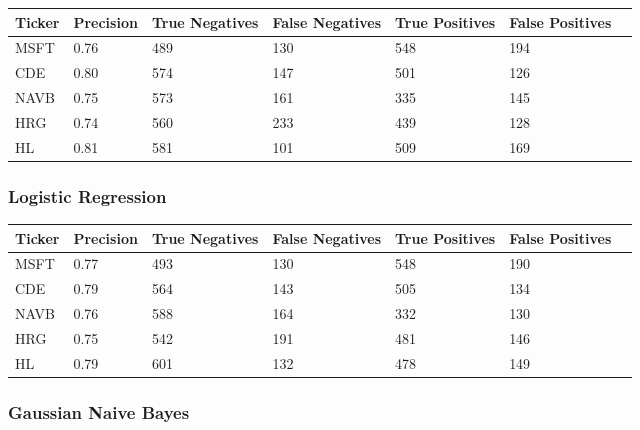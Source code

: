 \begin{center}
    \begin{tabular}{ | l | l | l | | l | l | l | p{5cm} |}
    \hline
    Ticker & Precision & True Negatives & False Negatives & True Positives & False Positives \\ \hline
    MSFT & 0.76 & 489 & 130 & 548 & 194 \\ \hline
    CDE & 0.80 & 574 & 147 & 501 & 126 \\ \hline
    NAVB & 0.75 & 573 & 161 & 335 & 145 \\ \hline
    HRG & 0.74 & 560 & 233 & 439 & 128 \\ \hline
    HL & 0.81 & 581 & 101 & 509 & 169 \\
    \hline
    \end{tabular}
    \label{table:nonfloat}
\end{center}

\subsubsection{Logistic Regression}

\begin{center}
    \begin{tabular}{ | l | l | l | | l | l | l | p{5cm} |}
    \hline
    Ticker & Precision & True Negatives & False Negatives & True Positives & False Positives \\ \hline
    MSFT & 0.77 & 493 & 130 & 548 & 190 \\ \hline
    CDE & 0.79 & 564 & 143 & 505 & 134 \\ \hline
    NAVB & 0.76 & 588 & 164 & 332 & 130 \\ \hline
    HRG & 0.75 & 542 & 191 & 481 & 146 \\ \hline
    HL & 0.79 & 601 & 132 & 478 & 149 \\
    \hline
    \end{tabular}
    \label{table:nonfloat}
\end{center}

\subsubsection{Gaussian Naive Bayes}

